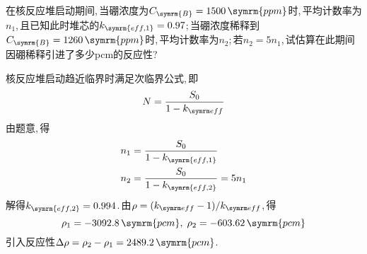 \begin{exercise}
    在核反应堆启动期间,\,当硼浓度为$C_{\symrm{B}} = 1500\,\symrm{ppm}$时,\,平均计数率为$n_1$,\,且已知此时堆芯的$k_{\symrm{eff,1}} = 0.97$;\,当硼浓度稀释到$C_{\symrm{B}} = 1260\,\symrm{ppm}$时,\,平均计数率为$n_2$;\,若$n_2 = 5n_1$,\,试估算在此期间因硼稀释引进了多少pcm的反应性?
    \begin{solution}
        核反应堆启动趋近临界时满足次临界公式,\,即
        \begin{equation*}
            N = \frac{S_0}{1-\keff}
        \end{equation*}
        由题意,\,得
        \begin{align*}
            &n_1 = \frac{S_0}{1-k_{\symrm{eff,1}}} \\
            &n_2 = \frac{S_0}{1-k_{\symrm{eff,2}}} = 5 n_1
        \end{align*}
        解得$k_{\symrm{eff,2}} = 0.994$.\,由$\rho = (\keff - 1)/\keff$,\,得
        \begin{equation*}
            \rho_1 = -3092.8\,\symrm{pcm},\;\rho_2 = -603.62\,\symrm{pcm}
        \end{equation*}
        引入反应性$\Delta \rho = \rho_2 - \rho_1 = 2489.2\,\symrm{pcm}$.\,
    \end{solution}
\end{exercise}